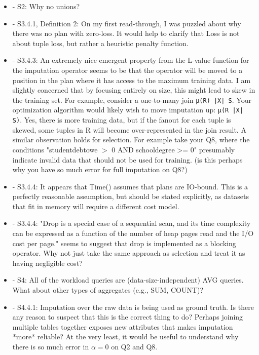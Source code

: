 \documentclass[draft,12pt]{article}
\begin{document}
\begin{itemize}
\item - S2: Why no unions?

\item - S3.4.1, Definition 2: On my first read-through, I was puzzled about why there was no plan with zero-loss. It would help to clarify that Loss is not about tuple loss, but rather a heuristic penalty function. 

\item - S3.4.3: An extremely nice emergent property from the L-value function for the imputation operator seems to be that the operator will be moved to a position in the plan where it has access to the maximum training data. I am slightly concerned that by focusing entirely on size, this might lead to skew in the training set. For example, consider a one-to-many join \verb/µ(R) |X| S/. Your optimization algorithm would likely wish to move imputation up: \verb/µ(R |X| S)/. Yes, there is more training data, but if the fanout for each tuple is skewed, some tuples in R will become over-represented in the join result. A similar observation holds for selection. For example take your Q8, where the conditions "studentdebtowe $>$ 0 AND schooldegree >= 0" presumably indicate invalid data that should not be used for training. (is this perhaps why you have so much error for full imputation on Q8?)

\item - S3.4.4: It appears that Time() assumes that plans are IO-bound. This is a perfectly reasonable assumption, but should be stated explicitly, as datasets that fit in memory will require a different cost model.

\item - S3.4.4: "Drop is a special case of a sequential scan, and its time complexity can be expressed as a function of the number of heap pages read and the I/O cost per page." seems to suggest that drop is implemented as a blocking operator. Why not just take the same approach as selection and treat it as having negligible cost?

\item - S4: All of the workload queries are (data-size-independent) AVG queries. What about other types of aggregates (e.g., SUM, COUNT)?

\item - S4.4.1: Imputation over the raw data is being used as ground truth. Is there any reason to suspect that this is the correct thing to do? Perhaps joining multiple tables together exposes new attributes that makes imputation *more* reliable? At the very least, it would be useful to understand why there is so much error in $\alpha=0$ on Q2 and Q8. 


\end{itemize}
\end{document}
